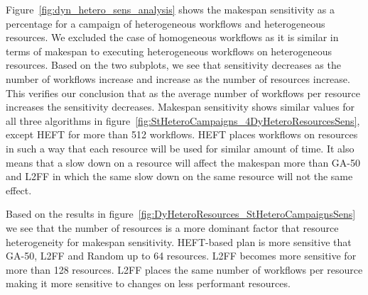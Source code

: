 Figure~\ref{fig:dyn_hetero_sens_analysis} shows the makespan sensitivity as a percentage for a campaign of heterogeneous workflows and heterogeneous resources.
We excluded the case of homogeneous workflows as it is similar in terms of makespan to executing heterogeneous workflows on heterogeneous resources.
Based on the two subplots, we see that sensitivity decreases as the number of workflows increase and increase as the number of resources increase.
This verifies our conclusion that as the average number of workflows per resource increases the sensitivity decreases.
Makespan sensitivity shows similar values for all three algorithms in figure~\ref{fig:StHeteroCampaigns_4DyHeteroResourcesSens}, except HEFT for more than 512 workflows.
HEFT places workflows on resources in such a way that each resource will be used for similar amount of time.
It also means that a slow down on a resource will affect the makespan more than GA-50 and L2FF in which the same slow down on the same resource will not the same effect.

Based on the results in figure~\ref{fig:DyHeteroResources_StHeteroCampaignsSens} we see that the number of resources is a more dominant factor that resource heterogeneity for makespan sensitivity.
HEFT-based plan is more sensitive that GA-50, L2FF and Random up to 64 resources.
L2FF becomes more sensitive for more than 128 resources.
L2FF places the same number of workflows per resource making it more sensitive to changes on less performant resources.

